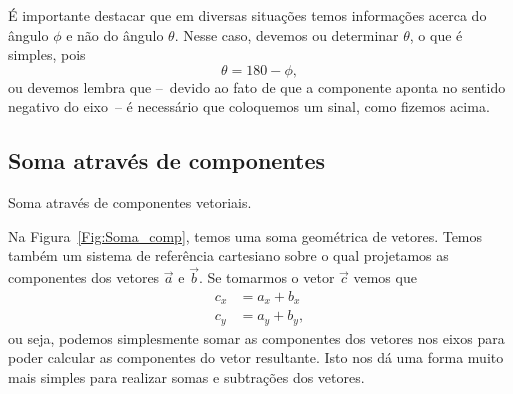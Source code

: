 É importante destacar que em diversas situações temos informações acerca do ângulo $\phi$ e não do ângulo $\theta$. Nesse caso, devemos ou determinar $\theta$, o que é simples, pois
\begin{equation}
    \theta = 180 - \phi,
\end{equation}
%
ou devemos lembra que --~devido ao fato de que a componente aponta no sentido negativo do eixo~-- é necessário que coloquemos um sinal, como fizemos acima.

\subsection{Soma através de componentes}

\begin{marginfigure}[4cm]
\centering
{}
\caption{Soma através de componentes vetoriais.\label{Fig:Soma_comp}}
\end{marginfigure}

Na Figura~\ref{Fig:Soma_comp}, temos uma soma geométrica de vetores. Temos também um sistema de referência cartesiano sobre o qual projetamos as componentes dos vetores $\vec{a}$ e $\vec{b}$. Se tomarmos o vetor $\vec{c}$ vemos que
\begin{align}
  c_x &= a_x + b_x \\
  c_y &= a_y + b_y,
\end{align}
%
ou seja, podemos simplesmente somar as componentes dos vetores nos eixos para poder calcular as componentes do vetor resultante. Isto nos dá uma forma muito mais simples para realizar somas e subtrações dos vetores.

